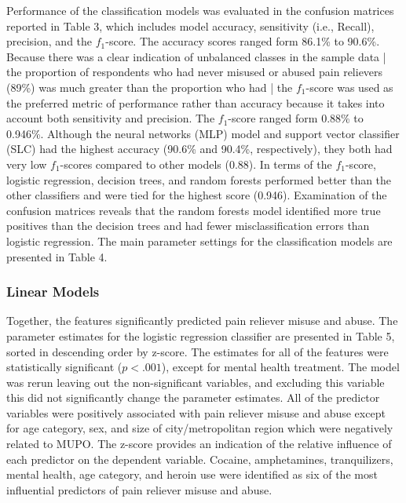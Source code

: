 \documentclass[sigconf]{acmart}
\begin{document}
Performance of the classification models was evaluated in the confusion 
matrices reported in Table 3, which includes model accuracy, sensitivity 
(i.e., Recall), precision, and the $f_1$-score. The accuracy scores
ranged form 86.1\% to 90.6\%. Because there was a clear indication of 
unbalanced classes in the sample data | the proportion of respondents who 
had never misused or abused pain relievers (89\%) was much greater than 
the proportion who had | the $f_1$-score was used as the preferred metric 
of performance rather than accuracy because it takes into account both 
sensitivity and precision. The $f_1$-score ranged form 0.88\% to 0.946\%.
Although the neural networks (MLP) model and support vector classifier 
(SLC) had the highest accuracy (90.6\% and 90.4\%, respectively), they 
both had very low $f_1$-scores compared to other models (0.88). In terms 
of the $f_1$-score, logistic regression, decision trees, and random forests 
performed better than the other classifiers and were tied for the highest 
score (0.946). Examination of the confusion matrices reveals that the 
random forests model identified more true positives than the decision 
trees and had fewer misclassification errors than logistic regression. 
The main parameter settings for the classification models are presented 
in Table 4.


\subsubsection{Linear Models}

Together, the features significantly predicted pain reliever misuse and abuse.
The parameter estimates for the logistic regression classifier are presented 
in Table 5, sorted in descending order by z-score. The estimates for all of 
the features were statistically significant ($p<.001$), except for mental 
health treatment. The model was rerun leaving out the non-significant 
variables, and excluding this variable this did not significantly change 
the parameter estimates. All of the predictor variables were positively 
associated with pain reliever misuse and abuse except for age category, sex,
and size of city/metropolitan region which were negatively related to MUPO. 
The z-score provides an indication of the relative influence of each predictor 
on the dependent variable. Cocaine, amphetamines, tranquilizers, mental health, 
age category, and heroin use were identified as six of the most influential 
predictors of pain reliever misuse and abuse. 
\end{document}
